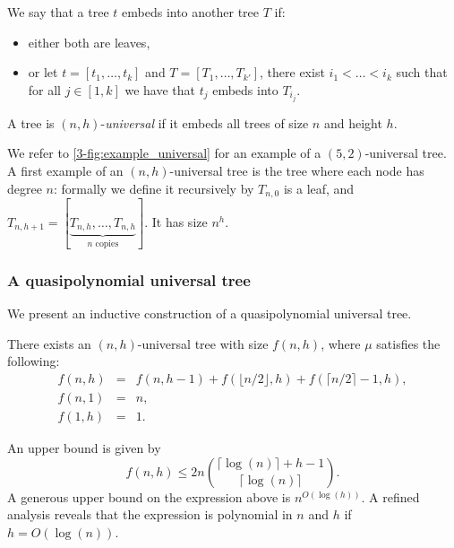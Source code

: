 We say that a tree $t$ embeds into another tree $T$ if:
\begin{itemize}
	\item either both are leaves,
	\item or let $t = [t_1,\dots,t_k]$ and $T = [T_1,\dots,T_{k'}]$, 
	there exist $i_1 < \dots < i_k$ such that for all $j \in [1,k]$ we have that $t_j$ embeds into $T_{i_j}$.
\end{itemize}

\begin{definition}
A tree is $(n,h)$-\textit{universal} if it embeds all trees of size $n$ and height $h$.
\end{definition}

We refer to \cref{3-fig:example_universal} for an example of a $(5,2)$-universal tree.
A first example of an $(n,h)$-universal tree is the tree where each node has degree $n$:
formally we define it recursively by $T_{n,0}$ is a leaf, and $T_{n,h+1} = [\underbrace{T_{n,h},\dots,T_{n,h}}_{n \text{ copies}}]$.
It has size $n^h$.

\subsubsection*{A quasipolynomial universal tree}
We present an inductive construction of a quasipolynomial universal tree.

\begin{theorem}
\label{3-thm:universal_tree}
There exists an $(n,h)$-universal tree with size $f(n,h)$, where $\mu$ satisfies the following:
$$\begin{array}{lll}
f(n,h) & = & f(n,h-1) + f(\lfloor n/2 \rfloor,h) + f(\lceil n/2 \rceil - 1,h), \\
f(n,1) & = & n, \\
f(1,h) & = & 1.
\end{array}$$
\end{theorem}
An upper bound is given by
\[
f(n,h) \le 2n \binom{\lceil \log(n) \rceil + h - 1}{\lceil \log(n) \rceil}.
\]
A generous upper bound on the expression above is $n^{O(\log(h))}$.
A refined analysis reveals that the expression is polynomial in $n$ and $h$ if $h = O(\log(n))$.


